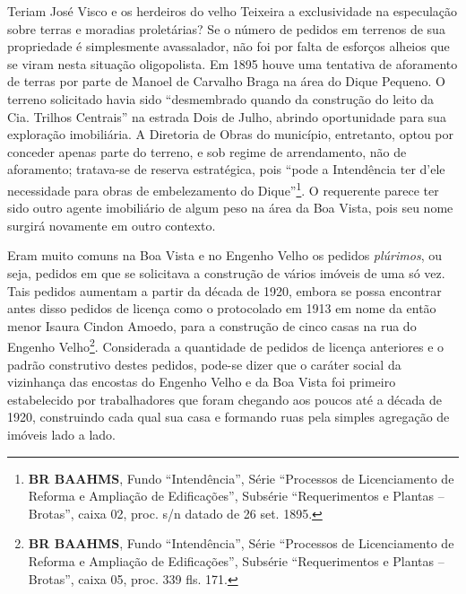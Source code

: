 Teriam José Visco e os herdeiros do velho Teixeira a exclusividade na especulação sobre terras e moradias proletárias? Se o número de pedidos em terrenos de sua propriedade é simplesmente avassalador, não foi por falta de esforços alheios que se viram nesta situação oligopolista. Em 1895 houve uma tentativa de aforamento de terras por parte de Manoel de Carvalho Braga na área do Dique Pequeno. O terreno solicitado havia sido ``desmembrado quando da construção do leito da Cia. Trilhos Centrais'' na estrada Dois de Julho, abrindo oportunidade para sua exploração imobiliária. A Diretoria de Obras do município, entretanto, optou por conceder apenas parte do terreno, e sob regime de arrendamento, não de aforamento; tratava-se de reserva estratégica, pois ``pode a Intendência ter d'ele necessidade para obras de embelezamento do Dique''\footnote{\textbf{BR BAAHMS}, Fundo ``Intendência'', Série ``Processos de Licenciamento de Reforma e Ampliação de Edificações'', Subsérie ``Requerimentos e Plantas -- Brotas'', caixa 02, proc. s/n datado de 26 set. 1895.}. O requerente parece ter sido outro agente imobiliário de algum peso na área da Boa Vista, pois seu nome surgirá novamente em outro contexto.


Eram muito comuns na Boa Vista e no Engenho Velho os pedidos \textit{plúrimos}, ou seja, pedidos em que se solicitava a construção de vários imóveis de uma só vez. Tais pedidos aumentam a partir da década de 1920, embora se possa encontrar antes disso pedidos de licença como o protocolado em 1913 em nome da então menor Isaura Cindon Amoedo, para a construção de cinco casas na rua do Engenho Velho\footnote{\textbf{BR BAAHMS}, Fundo ``Intendência'', Série ``Processos de Licenciamento de Reforma e Ampliação de Edificações'', Subsérie ``Requerimentos e Plantas -- Brotas'', caixa 05, proc. 339 fls. 171.}. Considerada a quantidade de pedidos de licença anteriores e o padrão construtivo destes pedidos, pode-se dizer que o caráter social da vizinhança das encostas do Engenho Velho e da Boa Vista foi primeiro estabelecido por trabalhadores que foram chegando aos poucos até a década de 1920, construindo cada qual sua casa e formando ruas pela simples agregação de imóveis lado a lado. 

